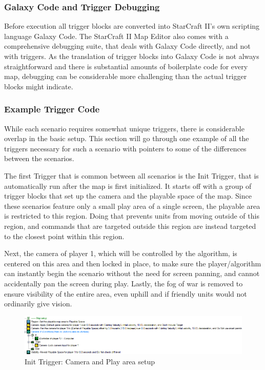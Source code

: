 \subsubsection{Galaxy Code and Trigger Debugging}
Before execution all trigger blocks are converted into StarCraft II's own scripting language Galaxy Code. The StarCraft II Map Editor also comes with a comprehensive debugging suite, that deals with Galaxy Code directly, and not with triggers. As the translation of trigger blocks into Galaxy Code is not always straightforward and there is substantial amounts of boilerplate code for every map, debugging can be considerable more challenging than the actual trigger blocks might indicate.


\subsubsection{Example Trigger Code}
While each scenario requires somewhat unique triggers, there is considerable overlap in the basic setup. This section will go through one example of all the triggers necessary for such a scenario with pointers to some of the differences between the scenarios.

The first Trigger that is common between all scenarios is the Init Trigger, that is automatically run after the map is first initialized.
It starts off with a group of trigger blocks that set up the camera and the playable space of the map. Since these scenarios feature only a small play area of a single screen, the playable area is restricted to this region. Doing that prevents units from moving outside of this region, and commands that are targeted outside this region are instead targeted to the closest point within this region.

Next, the camera of player 1, which will be controlled by the algorithm, is centered on this area and then locked in place, to make sure the player/algorithm can instantly begin the scenario without the need for screen panning, and cannot accidentally pan the screen during play. Lastly, the fog of war is removed to ensure visibility of the entire area, even uphill and if friendly units would not ordinarily give vision.

\begin{figure}[htb]
  \centering
      \includegraphics[width=1\textwidth]{Figures/Triggers/trigger_init_scenario.png}
  \caption{ Init Trigger: Camera and Play area setup }
\end{figure}

